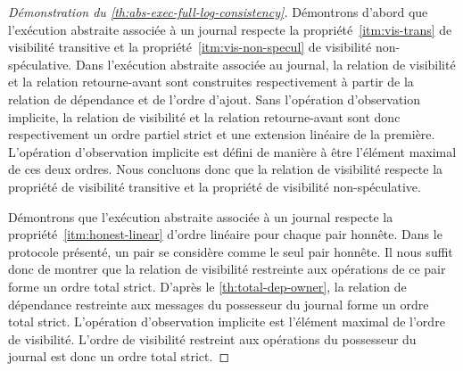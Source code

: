 \begin{proof}[Démonstration du \autoref{th:abs-exec-full-log-consistency}]
Démontrons d'abord que l'exécution abstraite associée à un journal respecte la propriété~\ref{itm:vis-trans} de visibilité transitive et la propriété~\ref{itm:vis-non-specul} de visibilité non-spéculative.
Dans l'exécution abstraite associée au journal, la relation de visibilité et la relation retourne-avant sont construites respectivement à partir de la relation de dépendance et de l'ordre d'ajout.
Sans l'opération d'observation implicite, la relation de visibilité et la relation retourne-avant sont donc respectivement un ordre partiel strict et une extension linéaire de la première.
L'opération d'observation implicite est défini de manière à être l'élément maximal de ces deux ordres.
Nous concluons donc que la relation de visibilité respecte la propriété de visibilité transitive et la propriété de visibilité non-spéculative.

\medskip

Démontrons que l'exécution abstraite associée à un journal respecte la propriété~\ref{itm:honest-linear} d'ordre linéaire pour chaque pair honnête.
Dans le protocole présenté, un pair se considère comme le seul pair honnête.
Il nous suffit donc de montrer que la relation de visibilité restreinte aux opérations de ce pair forme un ordre total strict.
D'après le \autoref{th:total-dep-owner}, la relation de dépendance restreinte aux messages du possesseur du journal forme un ordre total strict.
L'opération d'observation implicite est l'élément maximal de l'ordre de visibilité.
L'ordre de visibilité restreint aux opérations du possesseur du journal est donc un ordre total strict.

\medskip


\end{proof}
